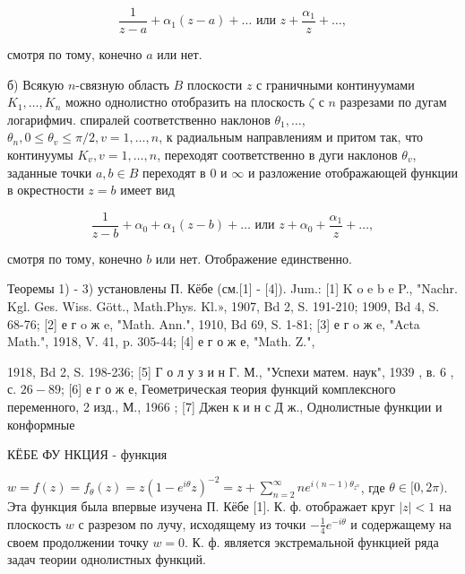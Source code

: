 \documentclass[10pt]{article}
\begin{document}
\[

\frac{1}{z-a}+\alpha_{1}(z-a)+\ldots \text { или } z+\frac{\alpha_{1}}{z}+\ldots,

\]



смотря по тому, конечно $a$ или нет.



б) Всякую $n$-связную область $B$ плоскости $z$ с граничными континуумами $K_{1}, \ldots, K_{n}$ можно однолистно отобразить на плоскость $\zeta$ с $n$ разрезами по дугам логарифмич. спиралей соответственно наклонов $\theta_{1}, \ldots$, $\theta_{n}, 0 \leqslant \theta_{v} \leqslant \pi / 2, v=1, \ldots, n$, к радиальным направлениям и притом так, что континуумы $K_{v}, v=1, \ldots, n$, переходят соответственно в дуги наклонов $\theta_{v}$, заданные точки $a, b \in B$ переходят в 0 и $\infty$ и разложение отображающей функции в окрестности $z=b$ имеет вид



\[

\frac{1}{z-b}+\alpha_{0}+\alpha_{1}(z-b)+\ldots \text { или } z+\alpha_{0}+\frac{\alpha_{1}}{z}+\ldots,

\]



смотря по тому, конечно $b$ или нет. Отображение единственно.



Теоремы 1) - 3) установлены П. Кёбе (см.[1] - [4]). Jum.: [1] K o e b e P., "Nachr. Kgl. Ges. Wiss. Gött., Math.Phys. Kl.», 1907, Bd 2, S. 191-210; 1909, Bd 4, S. 68-76; [2] е г o ж e, "Math. Ann.", 1910, Bd 69, S. 1-81; [3] е г o ж e, "Acta Math.", 1918, V. 41, p. 305-44; [4] е г о ж е, "Math. Z.",

1918, Bd 2, S. 198-236; [5] Г о л у з и н Г. М., "Успехи матем. наук", 1939 , в. 6 , с. $26-89$; [6] е г о ж е, Геометрическая теория функций комплексного переменного, 2 изд., М., 1966 ; [7] Джен к и н с Д ж., Однолистные функции и конформные



КЁБЕ ФУ НКЦИЯ - функция



$w=f(z)=f_{\theta}(z)=z\left(1-e^{i \theta} z\right)^{-2}=z+\sum_{n=2}^{\infty} n e^{i(n-1) \theta_{z^{n}}}$, где $\theta \in[0,2 \pi)$. Эта функция была впервые изучена П. Кёбе [1]. К. ф. отображает круг $|z|<1$ на плоскость $w$ с разрезом по лучу, исходящему из точки $-\frac{1}{4} e^{-i \theta}$ и содержащему на своем продолжении точку $w=0$. К. ф. является экстремальной функцией ряда задач теории однолистных функций.
\end{document}
